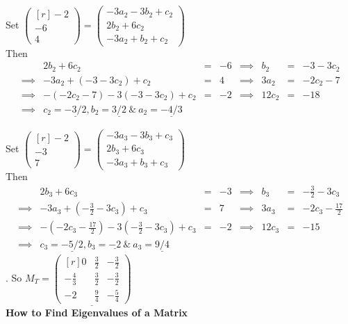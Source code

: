\documentclass[11pt,a4paper]{article}
\begin{document}
Set $\begin{pmatrix*}[r] -2 \\ -6 \\ 4 \end{pmatrix*} = \begin{pmatrix} -3a_2 -3b_2 + c_2 \\ 2b_2 + 6c_2 \\-3a_2 + b_2 + c_2 \end{pmatrix}$\\
Then \[\begin{array}{rrcrcccl}
  & 2b_2 + 6c_2 &=& -6 &\implies& b_2 &=& -3 -3c_2\\
  \implies& -3a_2 + (-3 -3c_2) + c_2 &=& 4 &\implies& 3a_2 &=& -2c_2 - 7\\
  \implies& -(-2c_2-7)-3(-3-3c_2)+c_2 &=& -2 &\implies& 12c_2 &=& -18\\
  \implies& c_2 = \underline{-3/2}, b_2 = \underline{3/2}\ \&\ a_2 = \underline{-4/3}
\end{array}\]

Set $\begin{pmatrix*}[r] -2 \\ -3 \\7 \end{pmatrix*} = \begin{pmatrix} -3a_3 -3b_3 + c_3 \\ 2b_3 + 6c_3 \\-3a_3 + b_3 + c_3 \end{pmatrix}$\\
Then \[\begin{array}{rrcrcccl}
  & 2b_3 + 6c_3 &=& -3 &\implies& b_3 &=& -\frac{3}{2} -3c_3\\
  \implies& -3a_3 + (-\frac{3}{2} -3c_3) + c_3 &=& 7 &\implies& 3a_3 &=& -2c_3 - \frac{17}{2}\\
  \implies& -(-2c_3-\frac{17}{2})-3(-\frac{3}{2}-3c_3)+c_3 &=& -2 &\implies& 12c_3 &=& -15\\
  \implies& c_3 = \underline{-5/2}, b_3 = \underline{-2}\ \&\ a_3 = \underline{9/4}
\end{array}\].
So $M_T = \underline{\begin{pmatrix*}[r] 0 & \frac{3}{2} & -\frac{3}{2} \\ -\frac{4}{3} & \frac{3}{2} & -\frac{3}{2} \\ -2 & \frac{9}{4} & -\frac{5}{4} \end{pmatrix*}}$\\

\textbf{How to Find Eigenvalues of a Matrix}\\
\end{document}
